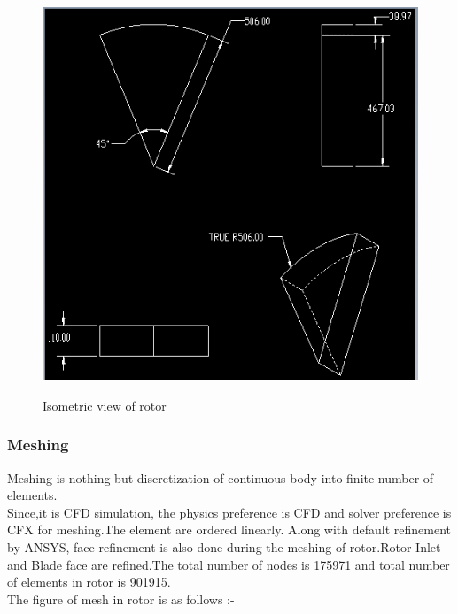 \documentclass[11pt]{article}
\begin{document}
 \begin{center}
 \begin{figure}[hbt!]
 \centering
 \includegraphics[scale=.6]{rotor.png}\\
 \caption{Isometric view of rotor}
 \end{figure}
 \end{center}
 \clearpage
\subsubsection{Meshing}
 
  Meshing is nothing but discretization of continuous body into finite number of elements.\\
 Since,it is CFD simulation, the physics preference is CFD and solver preference is CFX for meshing.The element are ordered linearly. 
Along with default refinement by ANSYS, face refinement is also done during the meshing of rotor.Rotor Inlet and Blade face are refined.The total number of nodes is 175971 and total number of elements in rotor is 901915.\\
The figure of mesh in rotor is as follows :-
\end{document}
